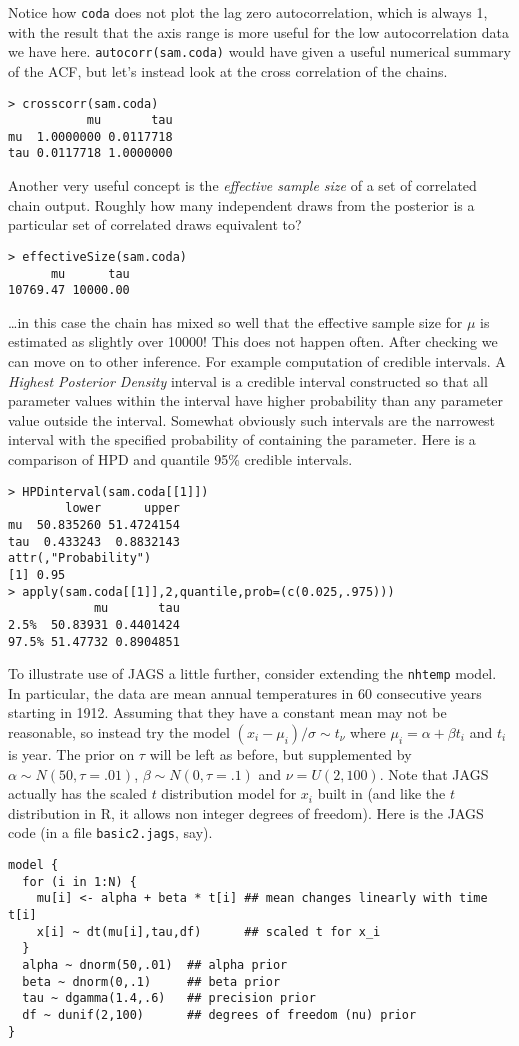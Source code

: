 \documentclass[10pt] {article}
\newcommand{\eps}[3]
{{\begin{center}
 \rotatebox{#1}{\scalebox{#2}{\texttt{[image: \#3]}}}
 \end{center}}
}
\theoremstyle{definition}
\begin{document}
\vspace*{-1cm}

\eps{-90}{.4}{coda-acf.eps}

\noindent Notice how {\tt coda} does not plot the lag zero autocorrelation, which is always 1, with the result that the axis range is more useful for the low autocorrelation data we have here. \lstinline+autocorr(sam.coda)+ would have given a useful numerical summary of the ACF, but let's instead look at the cross correlation of the chains.
\begin{lstlisting}
> crosscorr(sam.coda)
           mu       tau
mu  1.0000000 0.0117718
tau 0.0117718 1.0000000
\end{lstlisting}
Another very useful concept is the {\em effective sample size} of a set of correlated chain output. Roughly how many independent draws from the posterior is a particular set of correlated draws equivalent to?
\begin{lstlisting}
> effectiveSize(sam.coda)
      mu      tau 
10769.47 10000.00
\end{lstlisting}
\ldots in this case the chain has mixed so well that the effective sample size for $\mu$ is estimated as slightly over 10000! This does not happen often. After checking we can move on to other inference. For example computation of credible intervals. A {\em Highest Posterior Density} interval is a credible interval constructed so that all parameter values within the interval have higher probability than any parameter value outside the interval. Somewhat obviously such intervals are the narrowest interval with the specified probability of containing the parameter. Here is a comparison of HPD and quantile 95\% credible intervals.  
\begin{lstlisting}
> HPDinterval(sam.coda[[1]])
        lower      upper
mu  50.835260 51.4724154
tau  0.433243  0.8832143
attr(,"Probability")
[1] 0.95
> apply(sam.coda[[1]],2,quantile,prob=(c(0.025,.975)))
            mu       tau
2.5%  50.83931 0.4401424
97.5% 51.47732 0.8904851
\end{lstlisting}

To illustrate use of JAGS a little further, consider extending the {\tt nhtemp} model. In particular, the data are mean annual temperatures in 60 consecutive years starting in 1912. Assuming that they have a constant mean may not be reasonable, so instead try the model $(x_i-\mu_i)/\sigma \sim t_\nu$ where $\mu_i = \alpha + \beta t_i$ and $t_i$ is year. The prior on $\tau$ will be left as before, but supplemented by $\alpha \sim N(50,\tau=.01)$, $\beta \sim N(0,\tau=.1)$ and $\nu = U(2,100)$. Note that JAGS actually has the scaled $t$ distribution model for $x_i$ built in (and like the $t$ distribution in R, it allows non integer degrees of freedom). Here is the JAGS code (in a file {\tt basic2.jags}, say).
\begin{lstlisting}
model {
  for (i in 1:N) {
    mu[i] <- alpha + beta * t[i] ## mean changes linearly with time t[i]
    x[i] ~ dt(mu[i],tau,df)      ## scaled t for x_i
  }
  alpha ~ dnorm(50,.01)  ## alpha prior
  beta ~ dnorm(0,.1)     ## beta prior
  tau ~ dgamma(1.4,.6)   ## precision prior
  df ~ dunif(2,100)      ## degrees of freedom (nu) prior
}
\end{lstlisting}
\end{document}
